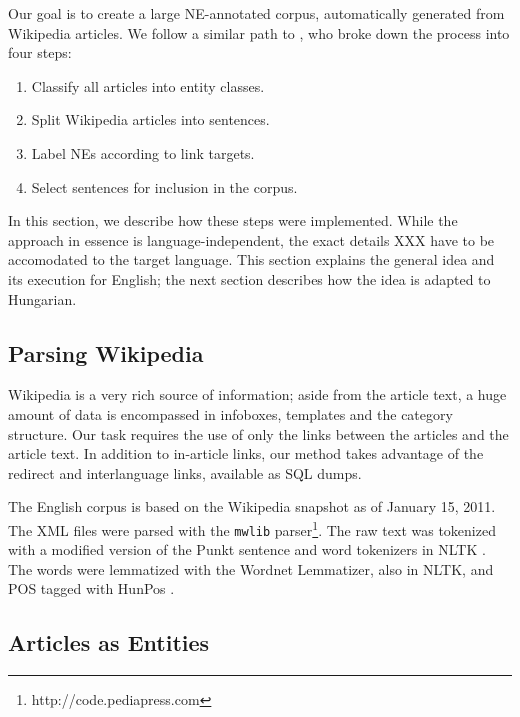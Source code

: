 \documentclass[11pt]{article}
\begin{document}
Our goal is to create a large NE-annotated corpus, automatically generated from Wikipedia articles. We follow a similar path to \cite{Nothman:08}, who broke down the process into four steps:

\begin{enumerate}
\item Classify all articles into entity classes.
\item Split Wikipedia articles into sentences.
\item Label NEs according to link targets.
\item Select sentences for inclusion in the corpus.
\end{enumerate}

In this section, we describe how these steps were implemented. While the approach in essence is language-independent, the exact details XXX have to be accomodated to the target language. This section explains the general idea and its execution for English; the next section describes how the idea is adapted to Hungarian.

\subsection{Parsing Wikipedia}

Wikipedia is a very rich source of information; aside from the article text, a huge amount of data is encompassed in infoboxes, templates and the category structure. Our task requires the use of only the links between the articles and the article text. In addition to in-article links, our method takes advantage of the redirect and interlanguage links, available as SQL dumps.

The English corpus is based on the Wikipedia snapshot as of January 15, 2011. The XML files were parsed with the \texttt{mwlib} parser\footnote{http://code.pediapress.com}. The raw text was tokenized with a modified version of the Punkt sentence and word tokenizers \cite{Kiss:06} in NLTK \cite{Loper:02}. The words were lemmatized with the Wordnet Lemmatizer, also in NLTK, and POS tagged with HunPos \cite{Halacsy:07}.


\subsection{Articles as Entities}
\label{dbpedia}
\end{document}
